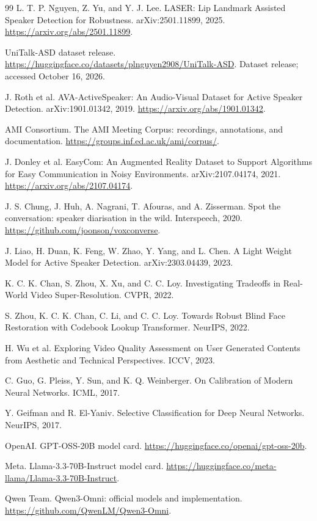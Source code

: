 {\begin{thebibliography}{99}
 L. T. P. Nguyen, Z. Yu, and Y. J. Lee. LASER: Lip Landmark Assisted Speaker Detection for Robustness. arXiv:2501.11899, 2025. \url{https://arxiv.org/abs/2501.11899}.

 UniTalk-ASD dataset release. \url{https://huggingface.co/datasets/plnguyen2908/UniTalk-ASD}. Dataset release; accessed October 16, 2026.

 J. Roth et al. AVA-ActiveSpeaker: An Audio-Visual Dataset for Active Speaker Detection. arXiv:1901.01342, 2019. \url{https://arxiv.org/abs/1901.01342}.

 AMI Consortium. The AMI Meeting Corpus: recordings, annotations, and documentation. \url{https://groups.inf.ed.ac.uk/ami/corpus/}.

 J. Donley et al. EasyCom: An Augmented Reality Dataset to Support Algorithms for Easy Communication in Noisy Environments. arXiv:2107.04174, 2021. \url{https://arxiv.org/abs/2107.04174}.

 J. S. Chung, J. Huh, A. Nagrani, T. Afouras, and A. Zisserman. Spot the conversation: speaker diarisation in the wild. Interspeech, 2020. \url{https://github.com/joonson/voxconverse}.

 J. Liao, H. Duan, K. Feng, W. Zhao, Y. Yang, and L. Chen. A Light Weight Model for Active Speaker Detection. arXiv:2303.04439, 2023.

 K. C. K. Chan, S. Zhou, X. Xu, and C. C. Loy. Investigating Tradeoffs in Real-World Video Super-Resolution. CVPR, 2022.

 S. Zhou, K. C. K. Chan, C. Li, and C. C. Loy. Towards Robust Blind Face Restoration with Codebook Lookup Transformer. NeurIPS, 2022.

 H. Wu et al. Exploring Video Quality Assessment on User Generated Contents from Aesthetic and Technical Perspectives. ICCV, 2023.

 C. Guo, G. Pleiss, Y. Sun, and K. Q. Weinberger. On Calibration of Modern Neural Networks. ICML, 2017.

 Y. Geifman and R. El-Yaniv. Selective Classification for Deep Neural Networks. NeurIPS, 2017.

 OpenAI. GPT-OSS-20B model card. \url{https://huggingface.co/openai/gpt-oss-20b}.

 Meta. Llama-3.3-70B-Instruct model card. \url{https://huggingface.co/meta-llama/Llama-3.3-70B-Instruct}.

 Qwen Team. Qwen3-Omni: official models and implementation. \url{https://github.com/QwenLM/Qwen3-Omni}.

\end{thebibliography}}


